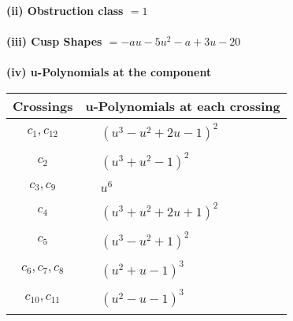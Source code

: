 \documentclass[1p]{elsarticle_modified}
\theoremstyle{definition}
\begin{document}
\flushleft \textbf{(ii) Obstruction class $= 1$}\\~\\
\flushleft \textbf{(iii) Cusp Shapes $= - a u-5 u^2- a+3 u-20$}\\~\\
\newpage\renewcommand{\arraystretch}{1}
\flushleft \textbf{(iv) u-Polynomials at the component}\newline \\
\begin{tabular}{m{50pt}|m{274pt}}
Crossings & \hspace{64pt}u-Polynomials at each crossing \\
\hline $$\begin{aligned}c_{1},c_{12}\end{aligned}$$&$\begin{aligned}
&(u^3- u^2+2 u-1)^2
\end{aligned}$\\
\hline $$\begin{aligned}c_{2}\end{aligned}$$&$\begin{aligned}
&(u^3+u^2-1)^2
\end{aligned}$\\
\hline $$\begin{aligned}c_{3},c_{9}\end{aligned}$$&$\begin{aligned}
&u^6
\end{aligned}$\\
\hline $$\begin{aligned}c_{4}\end{aligned}$$&$\begin{aligned}
&(u^3+u^2+2 u+1)^2
\end{aligned}$\\
\hline $$\begin{aligned}c_{5}\end{aligned}$$&$\begin{aligned}
&(u^3- u^2+1)^2
\end{aligned}$\\
\hline $$\begin{aligned}c_{6},c_{7},c_{8}\end{aligned}$$&$\begin{aligned}
&(u^2+u-1)^3
\end{aligned}$\\
\hline $$\begin{aligned}c_{10},c_{11}\end{aligned}$$&$\begin{aligned}
&(u^2- u-1)^3
\end{aligned}$\\
\hline
\end{tabular}\\~\\
\end{document}
